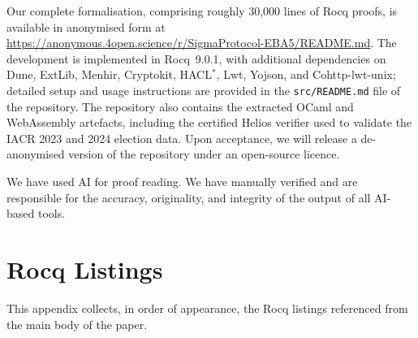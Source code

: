 \documentclass[sigconf,anonymous,review]{acmart}
\begin{document}
\begin{openscience}
Our complete formalisation, comprising roughly 30,000 lines of Rocq proofs, is
available in anonymised form at
\url{https://anonymous.4open.science/r/SigmaProtocol-EBA5/README.md}. The
development is implemented in Rocq~9.0.1, with additional dependencies on
Dune, ExtLib, Menhir, Cryptokit, HACL$^{*}$, Lwt, Yojson, and Cohttp-lwt-unix;
detailed setup and usage instructions are provided in the
\texttt{src/README.md} file of the repository. The repository also contains
the extracted OCaml and WebAssembly artefacts, including the certified Helios
verifier used to validate the IACR 2023 and 2024 election data. Upon
acceptance, we will release a de-anonymised version of the repository under an
open-source licence.
\end{openscience}

\begin{ai}
We have used AI for proof reading. We have manually verified
and are responsible for the accuracy, originality, and integrity of the
output of all AI-based tools.
\end{ai}




\section{Rocq Listings}\label{appendix_listings}
This appendix collects, in order of appearance, the Rocq listings referenced from the main body of the paper.
\end{document}
